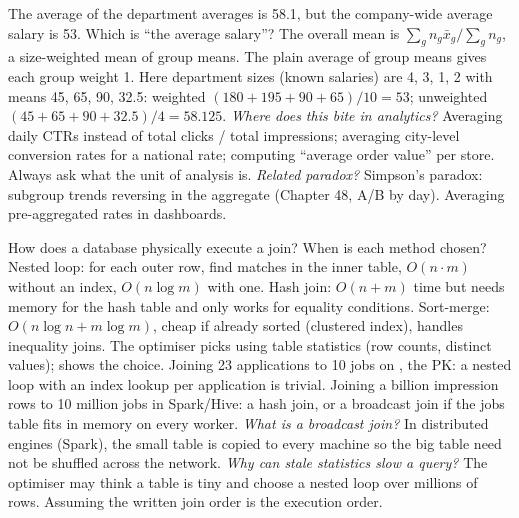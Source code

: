 \begin{qa}{\deep The average of the department averages is 58.1, but the company-wide average salary is 53. Which is ``the average salary''?}
\why The overall mean is $\sum_g n_g \bar x_g / \sum_g n_g$, a size-weighted mean of group means. The plain average of group means gives each group weight
1. Here department sizes (known salaries) are 4, 3, 1, 2 with means 45, 65, 90, 32.5: weighted $(180 + 195 + 90 + 65)/10 = 53$; unweighted $(45 + 65 +
90 + 32.5)/4 = 58.125$.
\pushes \emph{Where does this bite in analytics?} Averaging daily CTRs instead of total clicks / total impressions; averaging city-level conversion
rates for a national rate; computing ``average order value'' per store. Always ask what the unit of analysis is. \emph{Related paradox?} Simpson's
paradox: subgroup trends reversing in the aggregate (Chapter 48, A/B by day).
\pitfall Averaging pre-aggregated rates in dashboards.
\end{qa}

\begin{qa}{\deep How does a database physically execute a join? When is each method chosen?}
\why Nested loop: for each outer row, find matches in the inner table, $O(n \cdot m)$ without an index, $O(n \log m)$ with one. Hash join: $O(n + m)$
time but needs memory for the hash table and only works for equality conditions. Sort-merge: $O(n\log n + m\log m)$, cheap if already sorted
(clustered index), handles inequality joins. The optimiser picks using table statistics (row counts, distinct values);  shows the choice.
\worked Joining 23 applications to 10 jobs on , the PK: a nested loop with an index lookup per application is trivial. Joining a billion
impression rows to 10 million jobs in Spark/Hive: a hash join, or a broadcast join if the jobs table fits in memory on every worker.
\pushes \emph{What is a broadcast join?} In distributed engines (Spark), the small table is copied to every machine so the big table need not be
shuffled across the network. \emph{Why can stale statistics slow a query?} The optimiser may think a table is tiny and choose a nested loop over millions
of rows.
\pitfall Assuming the written join order is the execution order.
\end{qa}
